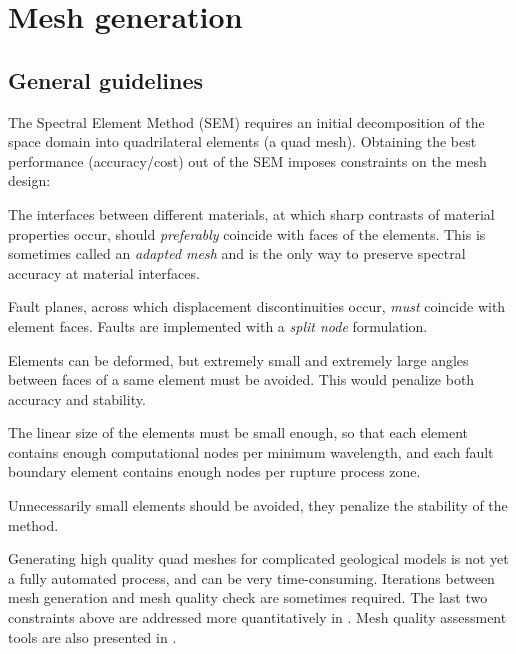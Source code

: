 \chapter{Mesh generation}
\label{Cha:meshing}

\section{General guidelines}

The Spectral Element Method (SEM) requires an initial decomposition 
of the space domain into quadrilateral elements (a quad mesh).
Obtaining the best performance (accuracy/cost) out of the SEM imposes constraints
on the mesh design:
\begin{sitemize}
\item The interfaces between different materials, 
at which sharp contrasts of material properties occur,
should {\it preferably} coincide with faces of the elements. 
This is sometimes called an {\it adapted mesh} 
and is the only way to preserve spectral accuracy at material interfaces.
\item Fault planes, across which displacement discontinuities occur,
{\it must} coincide with element faces. 
Faults are implemented with a {\it split node} formulation.
\item Elements can be deformed, but extremely small and extremely large 
angles between faces of a same element must be avoided. 
This would penalize both accuracy and stability.
\item The linear size of the elements must be small enough, so that each element
contains enough computational nodes per minimum wavelength,
and each fault boundary element contains enough nodes per rupture process zone.
\item Unnecessarily small elements should be avoided, 
they penalize the stability of the method. 
\end{sitemize}
Generating high quality quad meshes for complicated geological models
is not yet a fully automated process, and can be very time-consuming.
Iterations between mesh generation and mesh quality check are sometimes required.
The last two constraints above are addressed more quantitatively in .
Mesh quality assessment tools are also presented in .

